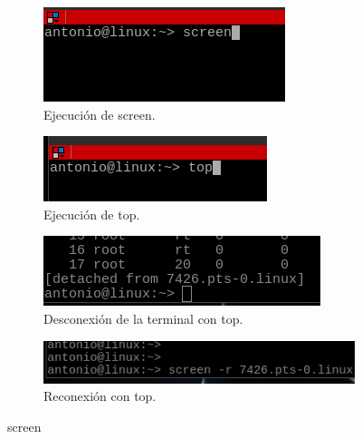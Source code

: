 \begin{figure}[H] 
  \begin{subfigure}[b]{0.5\linewidth}
    \centering
    \includegraphics[width=0.75\linewidth]{imagenes/img12} 
    \caption{Ejecución de screen.} 
    \label{fig12} 
    \vspace{4ex}
  \end{subfigure}%
  \begin{subfigure}[b]{0.5\linewidth}
    \centering
    \includegraphics[width=0.75\linewidth]{imagenes/img13} 
    \caption{Ejecución de top.} 
    \label{fig13} 
    \vspace{4ex}
  \end{subfigure} 
  \begin{subfigure}[b]{0.5\linewidth}
    \centering
    \includegraphics[width=0.75\linewidth]{imagenes/img14} 
    \caption{Desconexión de la terminal con top.} 
    \label{fig14} 
  \end{subfigure}%
  \begin{subfigure}[b]{0.5\linewidth}
    \centering
    \includegraphics[width=0.75\linewidth]{imagenes/img15} 
    \caption{Reconexión con top.} 
    \label{fig15} 
  \end{subfigure} 
  \caption{screen}
  \label{fig16} 
\end{figure}






